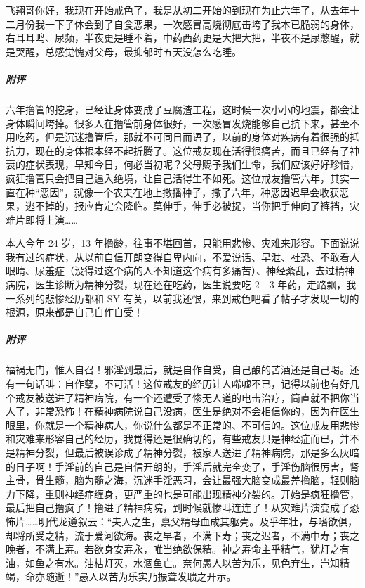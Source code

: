 \begin{case}
    飞翔哥你好，我现在开始戒色了，我是从初二开始的到现在为止六年了，从去年十二月份我一下子体会到了自食恶果，一次感冒高烧彻底击垮了我本已脆弱的身体，右耳耳鸣、尿频，半夜更是睡不着，中药西药更是大把大把，半夜不是尿憋醒，就是哭醒，总感觉愧对父母，最抑郁时五天没怎么吃睡。
    \subparagraph{附评} 六年撸管的挖身，已经让身体变成了豆腐渣工程，这时候一次小小的地震，都会让身体瞬间垮掉。很多人在撸管前身体很好，一次感冒发烧能够自己抗下来，甚至不用吃药，但是沉迷撸管后，那就不可同日而语了，以前的身体对疾病有着很强的抵抗力，现在的身体根本经不起折腾了。这位戒友现在活得很痛苦，而且已经有了神衰的症状表现，早知今日，何必当初呢？父母赐予我们生命，我们应该好好珍惜，疯狂撸管只会把自己逼入绝境，让自己活得生不如死。这位戒友撸管六年，其实一直在种“恶因”，就像一个农夫在地上撒播种子，撒了六年，种恶因迟早会收获恶果，逃不掉的，报应肯定会降临。莫伸手，伸手必被捉，当你把手伸向了裤裆，灾难片即将上演……
\end{case}

\begin{case}
    本人今年 24 岁，13 年撸龄，往事不堪回首，只能用悲惨、灾难来形容。下面说说我有过的症状，从以前自信开朗变得自卑内向，不爱说话、早泄、社恐、不敢看人眼睛、尿羞症（没得过这个病的人不知道这个病有多痛苦）、神经紊乱，去过精神病院，医生诊断为精神分裂，现在还在吃药，医生说要吃 2 - 3 年药，走路飘，我一系列的悲惨经历都和 SY 有关，以前我还恨，来到戒色吧看了帖子才发现一切的根源，原来都是自己自作自受！
    \subparagraph{附评} 福祸无门，惟人自召！邪淫到最后，就是自作自受，自己酿的苦酒还是自己喝。还有一句话叫：自作孽，不可活！这位戒友的经历让人唏嘘不已，记得以前也有好几个戒友被送进了精神病院，有一个还遭受了惨无人道的电击治疗，简直就不把你当人了，非常恐怖！在精神病院说自己没病，医生是绝对不会相信你的，因为在医生眼里，你就是一个精神病人，你说什么都是不正常的、不可信的。这位戒友用悲惨和灾难来形容自己的经历，我觉得还是很确切的，有些戒友只是神经症而已，并不是精神分裂，但最后被误诊成了精神分裂，被家人送进了精神病院，那是多么灰暗的日子啊！手淫前的自己是自信开朗的，手淫后就完全变了，手淫伤脑很厉害，肾主骨，骨生髓，脑为髓之海，沉迷手淫恶习，会让最强大脑变成最差撸脑，轻则脑力下降，重则神经症缠身，更严重的也是可能出现精神分裂的。开始是疯狂撸管，最后把自己撸疯了！撸进了精神病院，到时候就惨叫连连了！从灾难片演变成了恐怖片……明代龙遵叙云：“夫人之生，禀父精母血成其躯壳。及乎年壮，与嗜欲俱，却将所受之精，流于爱河欲海。丧之早者，不满下寿；丧之迟者，不满中寿；丧之晚者，不满上寿。若欲身安寿永，唯当绝欲保精。神之寿命主乎精气，犹灯之有油，如鱼之有水。油枯灯灭，水涸鱼亡。奈何愚人以苦为乐，见色弃生，岂知精竭，命亦随逝！”愚人以苦为乐实乃振聋发聩之开示。
\end{case}

